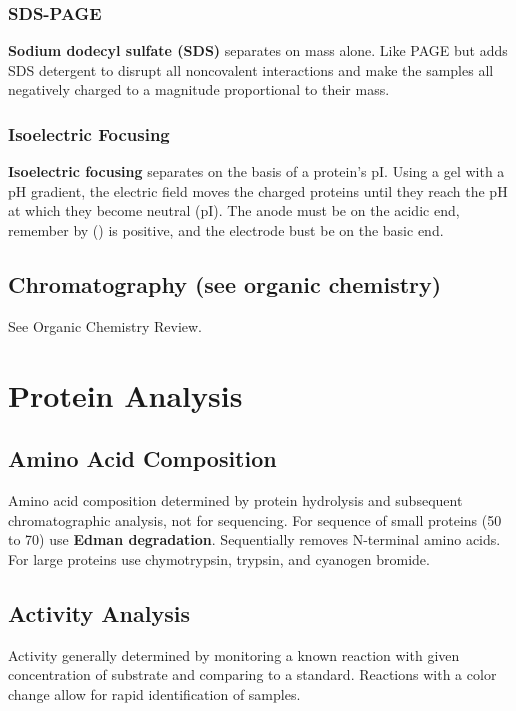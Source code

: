\documentclass[../Bio_chemistryReview.tex]{subfiles}
\begin{document}
	\subsubsection{SDS-PAGE\supdag}
	
	\textbf{Sodium dodecyl sulfate (SDS)} separates on mass alone. Like PAGE but adds SDS detergent to disrupt all noncovalent interactions and make the samples all negatively charged to a magnitude proportional to their mass.
	
	\subsubsection{Isoelectric Focusing\supdag}	
	
	\textbf{Isoelectric focusing} separates on the basis of a protein's pI. Using a gel with a pH gradient, the electric field moves the charged proteins until they reach the pH at which they become neutral (pI). The anode must be on the acidic end, remember by () is positive, and the electrode bust be on the basic end.
	
	\subsection{Chromatography (see organic chemistry)\supdag}
	
	See Organic Chemistry Review.
	
	\section{Protein Analysis\supdag}
	
	\subsection{Amino Acid Composition\supdag}
	
	Amino acid composition determined by protein hydrolysis and subsequent chromatographic analysis, not for sequencing. For sequence of small proteins (50 to 70) use \textbf{Edman degradation}. Sequentially removes N-terminal amino acids. For large proteins use chymotrypsin, trypsin, and cyanogen bromide.
	
	\subsection{Activity Analysis\supdag} 
	
	Activity generally determined by monitoring a known reaction with given concentration of substrate and comparing to a standard. Reactions with a color change allow for rapid identification of samples.
	
\end{document}

